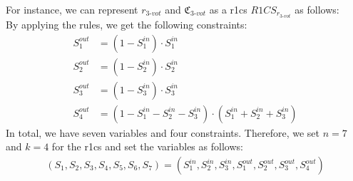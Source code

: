 

For instance, we can represent $r_{3\text{-}vot}$ and $\mathfrak{C}_{3\text{-}vot}$ as a \gls{r1cs} $R1CS_{r_{3\text{-}vot}}$ as follows:\\
By applying the rules, we get the following constraints:
\begin{align}
    S_1^{out} &=(1-S_1^{in})\cdot S_1^{in} \label{constraint1}\\
    S_2^{out} &=(1-S_2^{in})\cdot S_2^{in} \label{constraint2}\\
    S_3^{out} &=(1-S_3^{in})\cdot S_3^{in} \label{constraint3}\\
    S_4^{out} &=(1-S_1^{in}-S_2^{in}-S_3^{in})\cdot (S_1^{in}+S_2^{in}+S_3^{in}) \label{constraint4}
\end{align}
In total, we have seven variables and four constraints.
Therefore, we set $n=7$ and $k=4$ for the \gls{r1cs} and set the variables as follows:
\begin{align*}
    (S_1,S_2,S_3,S_4,S_5,S_6,S_7) = (S_1^{in}, S_2^{in}, S_3^{in}, S_1^{out}, S_2^{out}, S_3^{out}, S_4^{out})
\end{align*}

